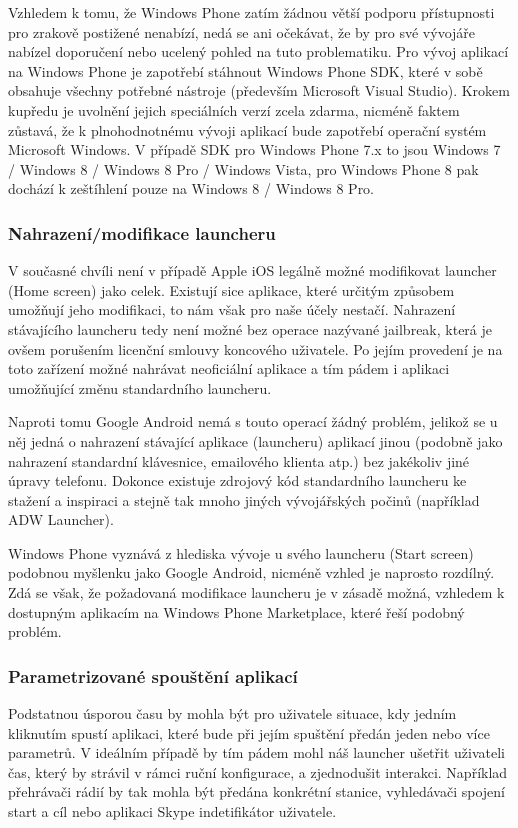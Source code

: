 \documentclass[thesis=M,czech]{FITthesis}[2012/06/26]
\begin{document}
Vzhledem k tomu, že Windows Phone zatím žádnou větší podporu přístupnosti pro zrakově postižené nenabízí, nedá se ani očekávat, že by pro své vývojáře nabízel doporučení nebo ucelený pohled na tuto problematiku. Pro vývoj aplikací na Windows Phone je zapotřebí stáhnout Windows Phone SDK\cite{win_sdk}, které v sobě obsahuje všechny potřebné nástroje\cite{win8_sdk} (především Microsoft Visual Studio). Krokem kupředu je uvolnění jejich speciálních verzí zcela zdarma, nicméně faktem zůstavá, že k plnohodnotnému vývoji aplikací bude zapotřebí operační systém Microsoft Windows. V případě SDK pro Windows Phone 7.x to jsou Windows 7 / Windows 8 / Windows 8 Pro / Windows Vista, pro Windows Phone 8 pak dochází k zeštíhlení pouze na Windows 8 / Windows 8 Pro.

\subsubsection{Nahrazení/modifikace launcheru}
V současné chvíli není v případě Apple iOS legálně možné modifikovat launcher (Home screen) jako celek. Existují sice aplikace, které určitým způsobem umožňují jeho modifikaci\cite{iphone_shortcuts}, to nám však pro naše účely nestačí. Nahrazení stávajícího launcheru tedy není možné bez operace nazývané jailbreak\cite{ios_jailbreak}, která je ovšem porušením licenční smlouvy koncového uživatele\cite{apple_about_jailbreak}. Po jejím provedení je na toto zařízení možné nahrávat neoficiální aplikace a tím pádem i aplikaci umožňující změnu standardního launcheru\cite{iphone_launcher}.

Naproti tomu Google Android nemá s touto operací žádný problém, jelikož se u něj jedná o nahrazení stávající aplikace (launcheru) aplikací jinou (podobně jako nahrazení standardní klávesnice, emailového klienta atp.) bez jakékoliv jiné úpravy telefonu. Dokonce existuje zdrojový kód standardního launcheru ke stažení a inspiraci\cite{android_launcher} a stejně tak mnoho jiných vývojářských počinů (například ADW Launcher\cite{android_adw_launcher}).

Windows Phone vyznává z hlediska vývoje u svého launcheru (Start screen) podobnou myšlenku jako Google Android, nicméně vzhled je naprosto rozdílný. Zdá se však, že požadovaná modifikace launcheru je v zásadě možná, vzhledem k dostupným aplikacím na Windows Phone Marketplace, které řeší podobný problém\cite{win_launcher}\cite{win_launcher2}.

\subsubsection{Parametrizované spouštění aplikací}
Podstatnou úsporou času by mohla být pro uživatele situace, kdy jedním kliknutím spustí aplikaci, které bude při jejím spuštění předán jeden nebo více parametrů. V ideálním případě by tím pádem mohl náš launcher ušetřit uživateli čas, který by strávil v rámci ruční konfigurace, a zjednodušit interakci. Například přehrávači rádií by tak mohla být předána konkrétní stanice, vyhledávači spojení start a cíl nebo aplikaci Skype indetifikátor uživatele.
\end{document}

